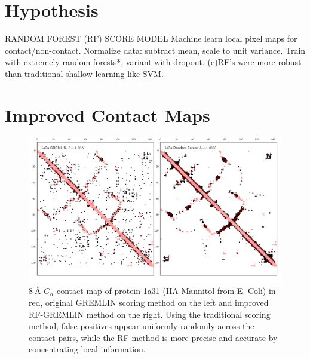 \documentclass[landscape]{sciposter}
\newlength{\customfigheight}
\begin{document}
\begin{multicols}{3}
\section*{Hypothesis}

RANDOM FOREST (RF) SCORE MODEL
Machine learn local pixel maps for contact/non-contact.
Normalize data: subtract mean, scale to unit variance.
Train with extremely random forests*, variant with dropout.
(e)RF's were more robust than traditional shallow learning like SVM.
\vfill \columnbreak

\section*{Improved Contact Maps}

\begin{figure}
    \center 
    \includegraphics[height=1.25\customfigheight]{figures/1a3a_cmp.png}%
\caption{$\SI{8}{\angstrom}$  $C_\alpha$ contact map of protein 1a31 (IIA Mannitol from E. Coli) in red, original GREMLIN scoring method on the left and improved RF-GREMLIN method on the right. Using the traditional scoring method, false positives appear uniformly randomly across the contact pairs, while the RF method is more precise and accurate by concentrating local information. }
\end{figure}

\vfill \columnbreak


\end{multicols}
\end{document}

